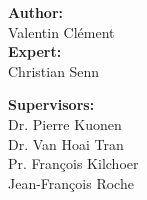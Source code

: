 \begin{titlepage}
\begin{center}
\begin{minipage}{0.4\textwidth}
\begin{flushleft} \large
\textbf{Author:}\\
Valentin Clément\\[0.3cm]
\textbf{Expert:}\\
Christian Senn
\end{flushleft}
\end{minipage}
\begin{minipage}{0.4\textwidth}
\begin{flushright} \large
\textbf{Supervisors:} \\
Dr. Pierre Kuonen\\
Dr. Van Hoai Tran\\
Pr. François Kilchoer\\
Jean-François Roche
\end{flushright}
\end{minipage}
 
\vfill
  
\end{center}
 
\end{titlepage}
